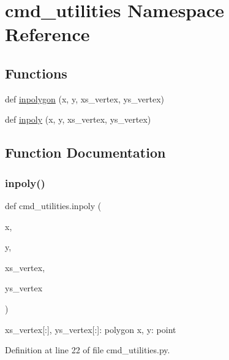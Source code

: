 \hypertarget{namespacecmd__utilities}{}\section{cmd\+\_\+utilities Namespace Reference}
\label{namespacecmd__utilities}
\subsection*{Functions}
\begin{DoxyCompactItemize}
\item 
def \hyperlink{namespacecmd__utilities_a016d198d084cbddc117765f2db6169db}{inpolygon} (x, y, xs\+\_\+vertex, ys\+\_\+vertex)
\item 
def \hyperlink{namespacecmd__utilities_ad7c7b1221baf98a83c4fd558b214c7bc}{inpoly} (x, y, xs\+\_\+vertex, ys\+\_\+vertex)
\end{DoxyCompactItemize}


\subsection{Function Documentation}
\mbox{\label{namespacecmd__utilities_ad7c7b1221baf98a83c4fd558b214c7bc}} 
\subsubsection{\texorpdfstring{inpoly()}{inpoly()}}
{\footnotesize\ttfamily def cmd\+\_\+utilities.\+inpoly (\begin{DoxyParamCaption}\item[{}]{x,  }\item[{}]{y,  }\item[{}]{xs\+\_\+vertex,  }\item[{}]{ys\+\_\+vertex }\end{DoxyParamCaption})}

\begin{DoxyVerb}xs_vertex[:], ys_vertex[:]: polygon
x, y: point
\end{DoxyVerb}
 

Definition at line 22 of file cmd\+\_\+utilities.\+py.


